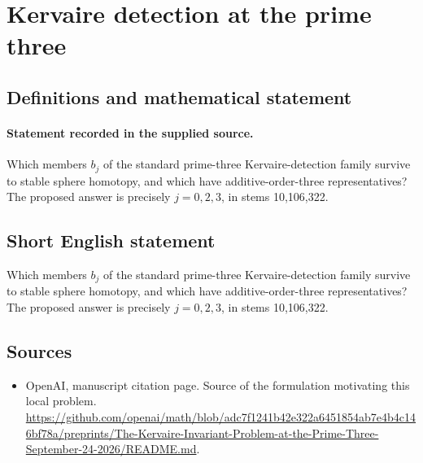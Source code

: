 \documentclass[11pt]{article}
\begin{document}
\section*{Kervaire detection at the prime three}\label{30007510}
\subsection{Definitions and mathematical statement}
\paragraph{Statement recorded in the supplied source.}
Which members $b_j$ of the standard prime-three Kervaire-detection family survive to stable sphere homotopy, and which have additive-order-three representatives? The proposed answer is precisely $j=0,2,3$, in stems 10,106,322.
\subsection{Short English statement}
Which members $b_j$ of the standard prime-three Kervaire-detection family survive to stable sphere homotopy, and which have additive-order-three representatives? The proposed answer is precisely $j=0,2,3$, in stems 10,106,322.
\subsection{Sources}
\begin{itemize}
\item[S1] OpenAI, manuscript citation page. Source of the formulation motivating this local problem.
\url{https://github.com/openai/math/blob/adc7f1241b42e322a6451854ab7e4b4c146bf78a/preprints/The-Kervaire-Invariant-Problem-at-the-Prime-Three-September-24-2026/README.md}.
\end{itemize}
\end{document}
